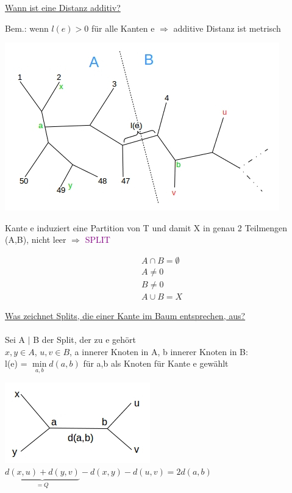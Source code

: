 \newpage
\underline{Wann ist eine Distanz additiv?}

Bem.: wenn $l(e) > 0$ für alle Kanten e $\Rightarrow$ additive Distanz ist metrisch

\begin{center}
	\includegraphics[scale=1]{lectures/161209/pix/pic5.jpg}
\end{center}

Kante e induziert eine Partition von T und damit X in genau 2 Teilmengen (A,B), nicht leer $\Rightarrow$ \textcolor{purple}{SPLIT}

\begin{align*}
 	&A \cap B = \emptyset \\
 	&A \neq 0 \\
 	&B \neq 0 \\
 	&A \cup B = X
\end{align*}

\underline{Was zeichnet Splits, die einer Kante im Baum entsprechen, aus?}\\\\
Sei A $|$ B der Split, der zu e gehört\\
$x,y \in A$, $u,v \in B$, a innerer Knoten in A, b innerer Knoten in B:\\
l(e) = $\min \limits_{a,b} d(a,b)$ für a,b als Knoten für Kante e gewählt


\begin{center}
	\includegraphics[scale=1]{lectures/161209/pix/pic6.jpg}\\
	$\underbrace{d(x,u) + d(y,v)}_{=Q} - d(x,y) - d(u,v) = 2d(a,b)$
\end{center}

